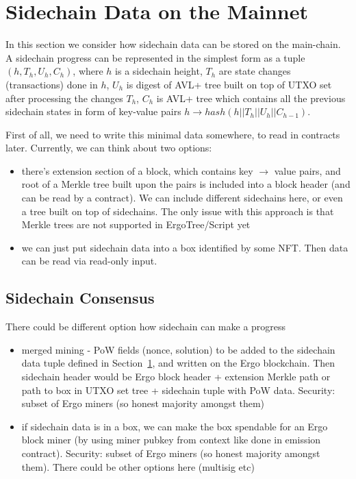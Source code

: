 \documentclass{article}   %
\begin{document}
\section{Sidechain Data on the Mainnet}
\label{side-data}

In this section we consider how sidechain data can be stored on the main-chain. A sidechain progress can be represented in the simplest form as a tuple $(h, T_h, U_h, C_{h})$, where
$h$ is a sidechain height, $T_h$ are state changes (transactions) done in $h$, $U_h$ is digest of AVL+ tree built on top
of UTXO set after processing the changes $T_h$, $C_{h}$ is AVL+ tree which contains all the previous sidechain states in form
of key-value pairs $h \rightarrow hash(h || T_h || U_h || C_{h-1})$.

First of all, we need to write this minimal data somewhere, to read in contracts later. Currently, we can think about two options:

\begin{itemize}
\item{} there's extension section of a block, which contains key $\rightarrow$ value pairs, and root of a Merkle tree built upon the pairs is included into a
block header (and can be read by a contract). We can include different sidechains here, or even a tree built on top of sidechains. The only issue with this approach is that Merkle trees are not supported in ErgoTree/Script yet

\item{} we can just put sidechain data into a box identified by some NFT. Then data can be read via read-only input.
\end{itemize}

\subsection{Sidechain Consensus}
\label{side-consensus}

There could be different option how sidechain can make a progress
\begin{itemize}
\item{} merged mining - PoW fields (nonce, solution) to be added to the sidechain data tuple defined in Section~\ref{side-data}, and written on the Ergo blockchain. Then sidechain header would be Ergo block header + extension Merkle path or path to box in UTXO set tree + sidechain tuple with PoW data. Security: subset of Ergo miners (so honest majority amongst them)

\item{} if sidechain data is in a box, we can make the box spendable for an Ergo block miner (by using miner pubkey from context like done in emission contract). Security: subset of Ergo miners (so honest majority amongst them). There could be other options here (multisig etc)
\end{itemize}
\end{document}
